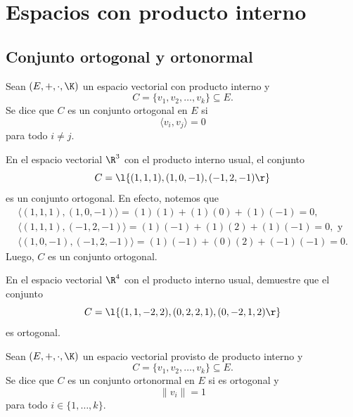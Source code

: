 \documentclass[compacto,10pt]{pubciencias-notas}
\begin{document}
\encabezado
\vspace*{-8mm}

\setcounter{section}{4}
\section{Espacios con producto interno}
\subsection{Conjunto ortogonal y ortonormal}


\begin{defi}
    Sean $(E,+,\cdot,\K)$ un espacio vectorial con producto interno  y
    \[C=\{v_1, v_2, \ldots, v_k\}\subseteq E.\] Se dice que $C$ es un conjunto ortogonal en $E$ si
    \[
        \langle  v_i, v_j \rangle  = 0
    \]
    para todo $i \neq j$.
\end{defi}

\begin{ejem}\hspace{0pt}\label{Sem08:EjemConjOrt} En el espacio vectorial $\R^{3}$ con el producto interno usual, el conjunto 
\[
    C = \l\{(1,1,1), (1,0,-1), (-1,2,-1)\r\}
\]
es un conjunto ortogonal. En efecto, notemos que
\[
\begin{array}{l}
    \langle (1,1,1), (1,0,-1)\rangle  = (1)(1) + (1)(0) + (1)(-1) = 0,\\
    \langle (1,1,1), (-1,2,-1)\rangle  = (1)(-1) + (1)(2) + (1)(-1) = 0,\text{ y}\\
    \langle (1,0,-1), (-1,2,-1)\rangle  = (1)(-1) + (0)(2) + (-1)(-1) = 0.
\end{array}
\]
Luego, $C$ es un conjunto ortogonal.
\end{ejem}

\begin{ejer}\hspace{0pt} En el espacio vectorial $\R^{4}$ con el producto interno usual, demuestre que el conjunto 
\[
    C = \l\{(1,1,-2,2), (0,2,2,1), (0,-2,1,2)\r\}
\]
es ortogonal.
\end{ejer}

\begin{defi}
Sean $(E,+,\cdot,\K)$ un espacio vectorial provisto de producto interno y
\[C = \{v_1, v_2, \ldots, v_k\} \subseteq E.\] Se dice que $C$ es un conjunto ortonormal en $E$ si es ortogonal y 
\[
    \| v_i\| =  1
\]
para todo $i \in \{1, \ldots, k\}$.
\end{defi}
\end{document}
